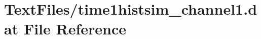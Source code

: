 \hypertarget{TextFiles_2time1histsim__channel1_8dat}{}\section{Text\+Files/time1histsim\+\_\+channel1.dat File Reference}
\label{TextFiles_2time1histsim__channel1_8dat}
